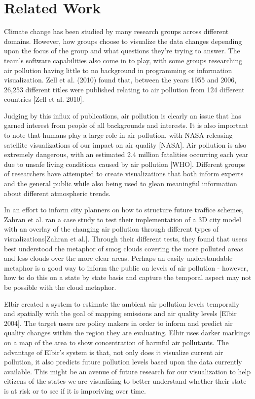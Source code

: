 \documentclass[journal]{vgtc}                %
\begin{document}
\section{Related Work}

Climate change has been studied by many research groups across different domains. However, how groups choose to visualize
the data changes depending upon the focus of the group and what questions they're trying to answer. The team's software
capabilities also come in to play, with some groups researching air pollution having little to no background in 
programming or information visualization. Zell et al. (2010) found that, between the years 1955 and 2006, 
26,253 different titles were published relating to air pollution from 124 different countries [Zell et al. 2010]. 


Judging by this influx of publications, air pollution is clearly an issue that has garned interest from people of all
backgrounds and interests. It is also important to note that humans play a large role in air pollution, with
NASA releasing satellite visualizations of our impact on air quality [NASA]. Air pollution is also extremely dangerous,
with an estimated 2.4 million fatalities occurring each year due to unsafe living conditions caused by air pollution [WHO].
Different groups of researchers have attempted to create visualizations that both inform
experts and the general public while also being used to glean meaningful information about different atmospheric trends.

In an effort to inform city planners on how to structure future traffice schemes, Zahran et al. ran a case study
to test their implementation of a 3D city model with an overlay of the changing air pollution through different types of
visualizations[Zahran et al.]. 
Through their different tests, they found that users best understood the metaphor of smog clouds 
covering the more polluted areas and less clouds over the more clear areas.
Perhaps an easily understandable metaphor is a good way to inform the public on levels of air pollution - however, how
to do this on a state by state basis and capture the temporal aspect may not be possible with the cloud metaphor. 

Elbir created a system to estimate the ambient air pollution levels temporally and spatially with the goal of mapping
emissions and air quality levels [Elbir 2004]. 
The target users are policy makers in order to inform and predict air quality changes within the region they are 
evaluating. Elbir uses darker markings on a map of the area to show concentration of harmful air pollutants.
The advantage of Elbir's system is that, not only does it visualize current air pollution, it also predicts future
pollution levels based upon the data currently available. This might be an avenue of future research for our
visualization to help citizens of the states we are visualizing to better understand whether their state is at risk or
to see if it is imporiving over time. 
\end{document}
